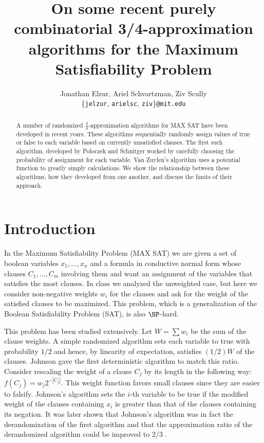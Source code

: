 \documentclass[11pt,letter]{article}
\numberwithin{theorem}{section}
\begin{document}

\title{On some recent purely combinatorial 3/4-approximation algorithms for the Maximum Satisfiability Problem}

\author{Jonathan Elzur, Ariel Schvartzman, Ziv Scully \\
  \{\texttt{jelzur}, \texttt{arielsc}, \texttt{ziv}\}\texttt{@mit.edu}}

\maketitle
\begin{abstract}
A number of randomized $\frac{3}{4}$-approximation algorithms for MAX SAT have been developed in recent years. These algorithms sequentially randomly assign values of true or false to each variable based on currently unsatisfied clauses. The first such algorithm, developed by Poloczek and Schnitger \cite{Poloczek:2011:RVJ:2133036.2133087} worked by carefully choosing the probability of assignment for each variable. Van Zuylen's algorithm \cite{vanZuylen:2011:SAM:2238496.2238512} uses a potential function to greatly simply calculations. We show the relationship between these algorithms, how they developed from one another, and discuss the limits of their approach.
\end{abstract}

\section{Introduction}

In the Maximum Satisfiability Problem (MAX SAT) we are given a set of boolean variables $x_1, ..., x_n$
and a formula in conductive normal form whose clauses $C_1,...,C_m$ involving them and 
want an assignment of the variables that satisfies the most clauses.
In class we analyzed the unweighted case, but here we consider non-negative weights $w_i$ for the clauses
and ask for the weight of the satisfied clauses to be maximized. This problem, which is a generalization of the
Boolean Satisfiability Problem (SAT), is also $\NP$-hard.

This problem has been studied extensively. Let $W = \sum w_i$ be the sum of the clause weights.
A simple randomized algorithm sets each variable to true with probability $1/2$ and hence,
by linearity of expectation, satisfies $(1/2)W$ of the clauses. Johnson \cite{Johnson1974256}
gave the first deterministic algorithm to match this ratio. Consider rescaling the weight of a clause $C_j$
by its length in the following way: $f(C_j) = w_j 2^{-|C_j|}$. This weight function favors small clauses
since they are easier to falsify. Johnson's algorithm sets the $i$-th variable to be true
if the modified weight of the clauses containing $x_i$ is greater than that of the clauses containing its negation.
It was later shown that Johnson's algorithm was in fact the derandomization of the first algorithm and that the
approximation ratio of the derandomized algorithm could be improved to $2/3$ \cite{Chen1999622}.
\end{document}
